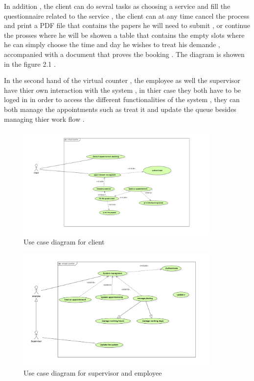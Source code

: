  In addition , the client can do sevral tasks as choosing a service and fill the questionnaire related to the service , the client can at any time cancel the process and print a PDF file that contains the papers he will need to submit , or continue the prosses where he will be showen a table that contains the empty slots where he can simply choose the time and day he wishes to treat his demande , accompanied with a document that proves the booking . The diagram is showen in the figure 2.1 .

 \medskip In the second hand of the virtual counter , the employee as well the supervisor have thier own interaction with the system , in thier case they both have to be loged in in order to access the different functionalities of the system , they can both manage the appointments such as treat it and update the queue besides managing thier work flow . 

 \begin{figure}[H]
    \centering
    \includegraphics[width=0.90\textwidth]{useCase_client.PNG}
    \caption{Use case diagram for client }
    \label{fig:Client use case diagram }
 \end{figure}
 \begin{figure}[H]
  \centering
  \includegraphics[width=0.90\textwidth]{useCase_supervisor.PNG}
  \caption{Use case diagram for supervisor and employee }
  \label{fig:employee/supervisor use case diagram }
\end{figure}

